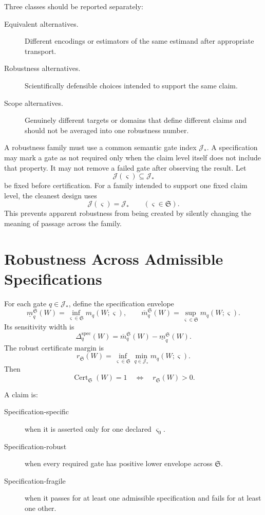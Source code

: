 Three classes should be reported separately:
\begin{description}
\item[Equivalent alternatives.] Different encodings or estimators of the same
 estimand after appropriate transport.
\item[Robustness alternatives.] Scientifically defensible choices intended to
 support the same claim.
\item[Scope alternatives.] Genuinely different targets or domains that define
 different claims and should not be averaged into one robustness number.
\end{description}


A robustness family must use a common semantic gate index
\(\mathcal J_*\). A specification may mark a gate as not required only when the
claim level itself does not include that property. It may not remove a failed
gate after observing the result. Let
\[
\mathcal J(\varsigma)\subseteq\mathcal J_*
\]
be fixed before certification. For a family intended to support one fixed
claim level, the cleanest design uses
\[
\mathcal J(\varsigma)=\mathcal J_*
\qquad
(\varsigma\in\mathfrak S).
\]
This prevents apparent robustness from being created by silently changing the
meaning of passage across the family.

\section{Robustness Across Admissible Specifications}

For each gate \(q\in\mathcal J_*\), define the specification envelope
\[
\boxed{
\underline m_q^{\mathfrak S}(W)
=
\inf_{\varsigma\in\mathfrak S}m_q(W;\varsigma),
\qquad
\overline m_q^{\mathfrak S}(W)
=
\sup_{\varsigma\in\mathfrak S}m_q(W;\varsigma).
}
\]
Its sensitivity width is
\[
\Delta_q^{\mathrm{spec}}(W)
=
\overline m_q^{\mathfrak S}(W)
-
\underline m_q^{\mathfrak S}(W).
\]
The robust certificate margin is
\[
\boxed{
r_{\mathfrak S}(W)
=
\inf_{\varsigma\in\mathfrak S}
\min_{q\in\mathcal J_*}m_q(W;\varsigma).
}
\]
Then
\[
\operatorname{Cert}_{\mathfrak S}(W)=1
\quad\Longleftrightarrow\quad
r_{\mathfrak S}(W)>0.
\]

\begin{SRWTdefinition}
A claim is:
\begin{description}
\item[Specification-specific] when it is asserted only for one declared
 \(\varsigma_0\).
\item[Specification-robust] when every required gate has positive lower
 envelope across \(\mathfrak S\).
\item[Specification-fragile] when it passes for at least one admissible
 specification and fails for at least one other.
\end{description}
\end{SRWTdefinition}

